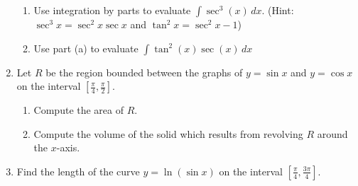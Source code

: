 \documentclass[12pt]{article}
\newif\ifans
\begin{document}
\begin{enumerate}
\begin{enumerate}
\item Use integration by parts to evaluate $\int \sec^{3}{(x)}\,dx$.  (Hint: $\sec^3{x}=\sec^2{x}\sec{x}$ and $\tan^2{x}=\sec^2{x}-1$)

\ifans{\fbox{$\frac{1}{2}\sec{(x)}\tan{(x)}+\frac{1}{2}\ln{|\sec{x}+\tan{x}|}+C$}} \fi

\item Use part (a) to evaluate $\int \tan^{2}{(x)}\sec{(x)}\,dx$

\ifans{\fbox{$\frac{1}{2}\sec{(x)}\tan{(x)}-\frac{1}{2}\ln{|\sec{x}+\tan{x}|}+C$}} \fi

\end{enumerate}

\item Let $R$ be the region bounded between the graphs of $y=\sin{x}$ and $y=\cos{x}$ on the interval $\left[\frac{\pi}{4},\frac{\pi}{2}\right]$.

\begin{enumerate}

\item Compute the area of $R$.

\ifans{\fbox{$\sqrt{2}-1$}} \fi

\item Compute the volume of the solid which results from revolving $R$ around the $x$-axis.

\ifans{\fbox{$\frac{\pi}{2}$}} \fi

\end{enumerate}

\item Find the length of the curve $y=\ln{(\sin{x})}$ on the interval $\left[\frac{\pi}{4},\frac{3\pi}{4}\right]$.

\ifans{\fbox{$2\ln{\left(2+\sqrt{2}\right)}-\ln{2}$}} \fi

\end{enumerate}
\end{document}
